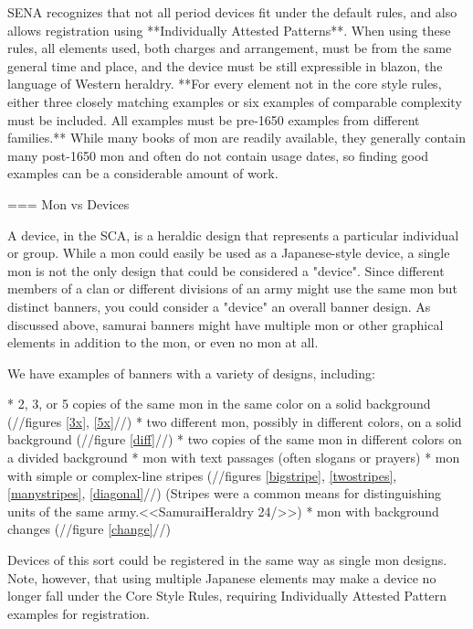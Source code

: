   SENA recognizes that not all period devices fit under the default
  rules, and also allows registration using **Individually Attested
  Patterns**. When using these rules, all elements used, both charges
  and arrangement, must be from the same general time and place, and
  the device must be still expressible in blazon, the language of
  Western heraldry.  **For every element not in the core style rules,
  either three closely matching examples or six examples of comparable
  complexity must be included.  All examples must be pre-1650 examples
  from different families.**  While many books of mon are readily
  available, they generally contain many post-1650 mon and often do
  not contain usage dates, so finding good examples can be a
  considerable amount of work.

  === Mon vs Devices

  A device, in the SCA, is a heraldic design that represents a
  particular individual or group.  While a mon could easily be used as
  a Japanese-style device, a single mon is not the only design that
  could be considered a "device".  Since different members of a clan
  or different divisions of an army might use the same mon but
  distinct banners, you could consider a "device" an overall banner
  design.  As discussed above, samurai banners might have multiple mon
  or other graphical elements in addition to the mon, or even no mon
  at all.

  We have examples of banners with a variety of designs, including:
  
  * 2, 3, or 5
  copies of the same mon in the same color on a solid background
  (//figures \ref{3x}, \ref{5x}//)
  * two different mon, possibly in
  different colors, on a solid background (//figure \ref{diff}//)
  * two copies of the same mon in different colors on a divided
  background
  * mon with text passages (often slogans or prayers)
  * mon with simple or complex-line stripes (//figures \ref{bigstripe}, \ref{twostripes},
  \ref{manystripes}, \ref{diagonal}//) (Stripes
  were a common means for distinguishing units of the same
  army.<<SamuraiHeraldry 24/>>)
  * mon with background changes (//figure \ref{change}//)

  Devices of this sort could be registered in the same way as single
  mon designs.  Note, however, that using multiple Japanese elements
  may make a device no longer fall under the Core Style Rules,
  requiring Individually Attested Pattern examples for registration.

